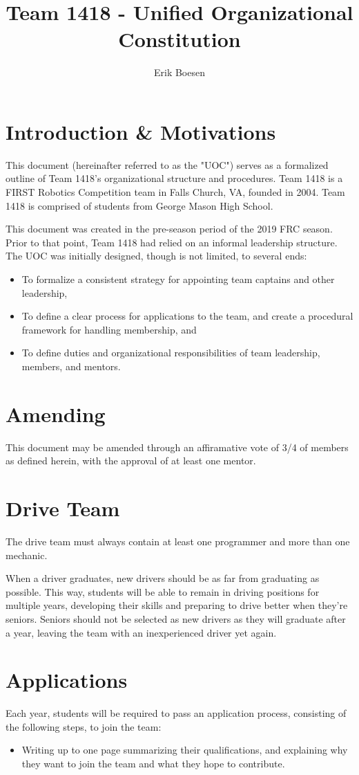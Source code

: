 \documentclass{proc}
\begin{document}
\title{Team 1418 - Unified Organizational Constitution}
\author{Erik Boesen}

\maketitle

\section{Introduction & Motivations}
This document (hereinafter referred to as the "UOC") serves as a formalized outline of Team 1418's organizational structure and procedures. Team 1418 is a FIRST Robotics Competition team in Falls Church, VA, founded in 2004. Team 1418 is comprised of students from George Mason High School.

This document was created in the pre-season period of the 2019 FRC season. Prior to that point, Team 1418 had relied on an informal leadership structure. The UOC was initially designed, though is not limited, to several ends:
\begin{itemize}
  \item{To formalize a consistent strategy for appointing team captains and other leadership,}
  \item{To define a clear process for applications to the team, and create a procedural framework for handling membership, and}
  \item{To define duties and organizational responsibilities of team leadership, members, and mentors.}
\end{itemize}

\section{Amending}
This document may be amended through an affiramative vote of 3/4 of members as defined herein, with the approval of at least one mentor.

\section{Drive Team}
The drive team must always contain at least one programmer and more than one mechanic.

When a driver graduates, new drivers should be as far from graduating as possible. This way, students will be able to remain in driving positions for multiple years, developing their skills and preparing to drive better when they're seniors. Seniors should not be selected as new drivers as they will graduate after a year, leaving the team with an inexperienced driver yet again.

\section{Applications}
Each year, students will be required to pass an application process, consisting of the following steps, to join the team:
\begin{itemize}
  \item{Writing up to one page summarizing their qualifications, and explaining why they want to join the team and what they hope to contribute.}
\end{itemize}
\end{document}
